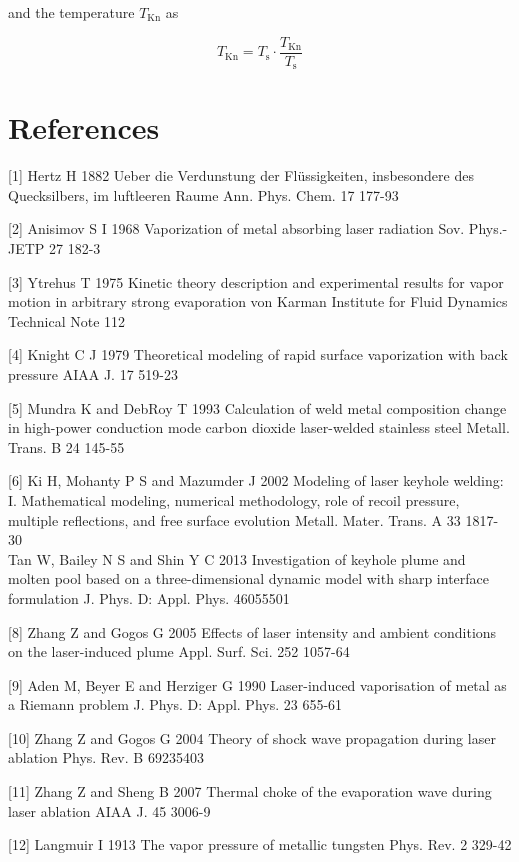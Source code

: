 \documentclass[10pt]{article}
\begin{document}
and the temperature $T_{\mathrm{Kn}}$ as


\begin{equation*}
T_{\mathrm{Kn}}=T_{\mathrm{s}} \cdot \frac{T_{\mathrm{Kn}}}{T_{\mathrm{s}}} \tag{A7}
\end{equation*}


\section*{References}
[1] Hertz H 1882 Ueber die Verdunstung der Flüssigkeiten, insbesondere des Quecksilbers, im luftleeren Raume Ann. Phys. Chem. 17 177-93

[2] Anisimov S I 1968 Vaporization of metal absorbing laser radiation Sov. Phys.-JETP 27 182-3

[3] Ytrehus T 1975 Kinetic theory description and experimental results for vapor motion in arbitrary strong evaporation von Karman Institute for Fluid Dynamics Technical Note 112

[4] Knight C J 1979 Theoretical modeling of rapid surface vaporization with back pressure AIAA J. 17 519-23

[5] Mundra K and DebRoy T 1993 Calculation of weld metal composition change in high-power conduction mode carbon dioxide laser-welded stainless steel Metall. Trans. B 24 145-55

[6] Ki H, Mohanty P S and Mazumder J 2002 Modeling of laser keyhole welding: I. Mathematical modeling, numerical methodology, role of recoil pressure, multiple reflections, and free surface evolution Metall. Mater. Trans. A 33 1817-30\\
[7] Tan W, Bailey N S and Shin Y C 2013 Investigation of keyhole plume and molten pool based on a three-dimensional dynamic model with sharp interface formulation J. Phys. D: Appl. Phys. 46055501

[8] Zhang Z and Gogos G 2005 Effects of laser intensity and ambient conditions on the laser-induced plume Appl. Surf. Sci. 252 1057-64

[9] Aden M, Beyer E and Herziger G 1990 Laser-induced vaporisation of metal as a Riemann problem J. Phys. D: Appl. Phys. 23 655-61

[10] Zhang Z and Gogos G 2004 Theory of shock wave propagation during laser ablation Phys. Rev. B 69235403

[11] Zhang Z and Sheng B 2007 Thermal choke of the evaporation wave during laser ablation AIAA J. 45 3006-9

[12] Langmuir I 1913 The vapor pressure of metallic tungsten Phys. Rev. 2 329-42
\end{document}
